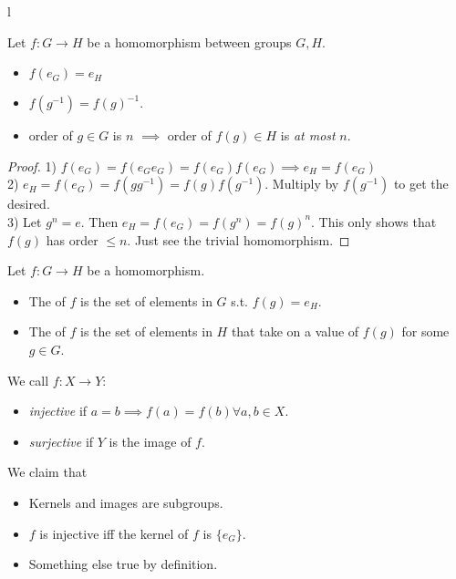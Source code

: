 l\documentclass{scrartcl}
\begin{document}
\begin{proposition}
	Let $f:G \rightarrow H$ be a homomorphism between groups $G,H$. 
	\begin{itemize}
		\item $f(e_G) = e_H$
		\item $f(g^{-1}) = f(g)^{-1}$.
		\item order of $g \in G$ is $n$ $\implies$ order of $f(g) \in H$ is \textit{at most} $n$.
	\end{itemize}
\end{proposition}
\begin{proof}
	1) $f(e_G) = f(e_Ge_G) = f(e_G)f(e_G) \implies e_H = f(e_G)$ \\
	2) $e_H = f(e_G) = f(gg^{-1}) = f(g)f(g^{-1})$. Multiply by $f(g^{-1})$ to get the desired. \\
	3) Let $g^n = e$. Then $e_H = f(e_G) = f(g^n) = f(g)^n$. This only shows that $f(g)$ has order $\le n$. Just see the trivial homomorphism.
\end{proof}

\begin{definition}
	Let $f : G \rightarrow H$ be a homomorphism.
	\begin{itemize}
		\item The  of $f$ is the set of elements in $G$ s.t. $f(g) = e_H$.
		\item The  of $f$ is the set of elements in $H$ that take on a value of $f(g)$ for some $g \in G$.
	\end{itemize}
\end{definition}

\begin{definition}
We call $f:X \rightarrow Y$:
\begin{itemize}
	\item \textit{injective} if $a=b \implies f(a)=f(b) \forall a,b \in X$.
	\item \textit{surjective} if $Y$ is the image of $f$.
\end{itemize}
\end{definition}

\begin{proposition}
	We claim that
	\begin{itemize}
		\item Kernels and images are subgroups.
		\item $f$ is injective iff the kernel of $f$ is $\{e_G\}$.
		\item Something else true by definition.
	\end{itemize}
\end{proposition}
\end{document}
